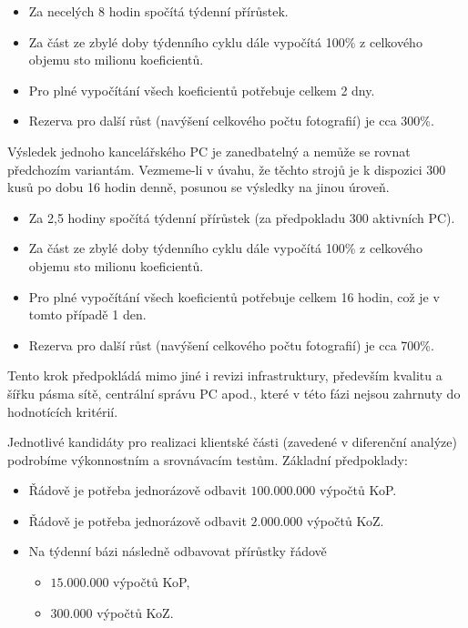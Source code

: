 \begin{itemize}
	\setlength{\parskip}{0pt}
	\setlength{\itemsep}{0pt}
	\item {Za necelých 8 hodin spočítá týdenní přírůstek.}
	\item {Za část ze zbylé doby týdenního cyklu dále vypočítá 100\% z celkového objemu sto milionu koeficientů.}
	\item {Pro plné vypočítání všech koeficientů potřebuje celkem 2 dny.}
	\item {Rezerva pro další růst (navýšení celkového počtu fotografií) je cca 300\%.}
\end{itemize}

Výsledek jednoho kancelářského PC je zanedbatelný a nemůže se rovnat předchozím variantám. Vezmeme-li v úvahu, že těchto strojů je k dispozici 300 kusů po dobu 16 hodin denně, posunou se výsledky na jinou úroveň.

\begin{itemize}
	\setlength{\parskip}{0pt}
	\setlength{\itemsep}{0pt}
	\item {Za 2,5 hodiny spočítá týdenní přírůstek (za předpokladu 300 aktivních PC).}
	\item {Za část ze zbylé doby týdenního cyklu dále vypočítá 100\% z celkového objemu sto milionu koeficientů.}
	\item {Pro plné vypočítání všech koeficientů potřebuje celkem 16 hodin, což je v tomto případě 1 den.}
	\item {Rezerva pro další růst (navýšení celkového počtu fotografií) je cca 700\%.}
\end{itemize}

Tento krok předpokládá mimo jiné i revizi infrastruktury, především kvalitu a šířku pásma sítě, centrální správu PC apod., které v této fázi nejsou zahrnuty do hodnotících kritérií.

Jednotlivé kandidáty pro realizaci klientské části (zavedené v diferenční analýze) podrobíme výkonnostním a srovnávacím testům.
Základní předpoklady:
\begin{itemize}
	\setlength{\parskip}{0pt}
	\setlength{\itemsep}{0pt}
	\item {Řádově je potřeba jednorázově odbavit $ 100.000.000 $ výpočtů KoP.}
	\item {Řádově je potřeba jednorázově odbavit $ 2.000.000 $ výpočtů KoZ.}
	\item {Na týdenní bázi následně odbavovat přírůstky řádově}
	\begin{itemize}
		\setlength{\parskip}{0pt}
		\setlength{\itemsep}{0pt}
		\item {$ 15.000.000 $ výpočtů KoP,}
		\item {$ 300.000 $ výpočtů KoZ}.
	\end{itemize}
\end{itemize}

